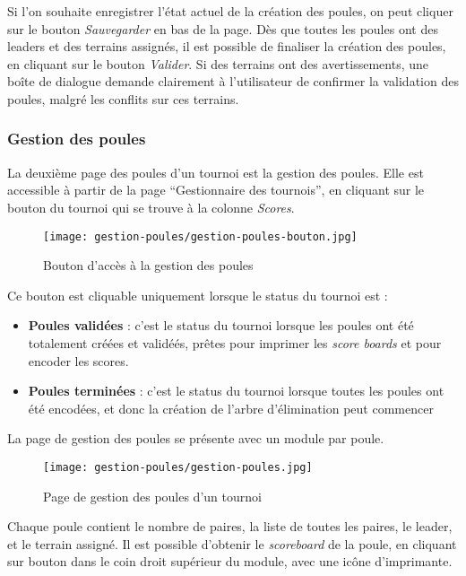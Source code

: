 Si l'on souhaite enregistrer l'état actuel de la création des poules, on peut cliquer sur le bouton \textit{Sauvegarder} en bas de la page. Dès que toutes les poules ont des leaders et des terrains assignés, il est possible de finaliser la création des poules, en cliquant sur le bouton \textit{Valider}. Si des terrains ont des avertissements, une boîte de dialogue demande clairement à l'utilisateur de confirmer la validation des poules, malgré les conflits sur ces terrains.

\subsubsection{Gestion des poules}

La deuxième page des poules d'un tournoi est la gestion des poules. Elle est accessible à partir de la page \enquote{Gestionnaire des tournois}, en cliquant sur le bouton du tournoi qui se trouve à la colonne \textit{Scores}.

\begin{figure}[H]
\centering
\texttt{[image: gestion-poules/gestion-poules-bouton.jpg]}
\caption{Bouton d'accès à la gestion des poules}
\end{figure}

Ce bouton est cliquable uniquement lorsque le status du tournoi est :

\begin{itemize}
\item \textbf{Poules validées} : c'est le status du tournoi lorsque les poules ont été totalement créées et validéés, prêtes pour imprimer les \textit{score boards} et pour encoder les scores.
\item \textbf{Poules terminées} : c'est le status du tournoi lorsque toutes les poules ont été encodées, et donc la création de l'arbre d'élimination peut commencer
\end{itemize}
\bigskip

La page de gestion des poules se présente avec un module par poule.

\begin{figure}[H]
\centering
\texttt{[image: gestion-poules/gestion-poules.jpg]}
\caption{Page de gestion des poules d'un tournoi}
\end{figure}

Chaque poule contient le nombre de paires, la liste de toutes les paires, le leader, et le terrain assigné. Il est possible d'obtenir le \textit{scoreboard} de la poule, en cliquant sur bouton dans le coin droit supérieur du module, avec une icône d'imprimante.

